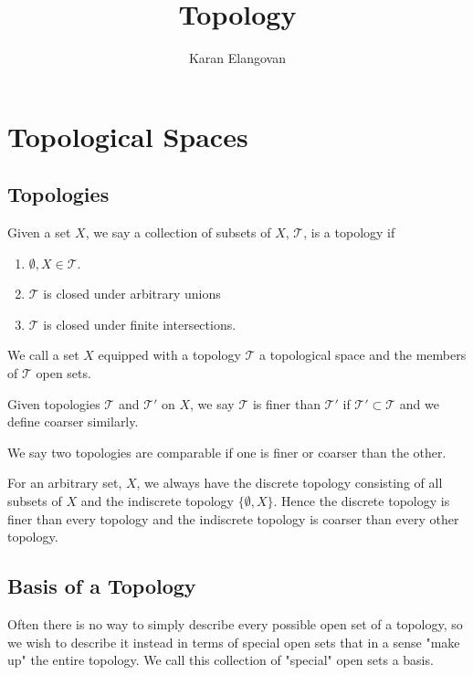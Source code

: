 \documentclass[]{article}
\title{Topology}
\author{Karan Elangovan}
\begin{document}
\maketitle

\doublespacing
\tableofcontents

\section{Topological Spaces}

\subsection{Topologies}

\begin{defi} [Topology]
		Given a set $X$, we say a collection of subsets of $X$, $\mathcal{T}$, is a topology if
		\begin{enumerate}
				\item $\emptyset, X \in \mathcal{T}$.
				\item $\mathcal{T}$ is closed under arbitrary unions
				\item $\mathcal{T}$ is closed under finite intersections.
		\end{enumerate}

		We call a set $X$ equipped with a topology $\mathcal{T}$ a topological space and the members of $\mathcal{T}$ open sets.
\end{defi}

\begin{defi} [Fineness]
		Given topologies $\mathcal{T}$ and $\mathcal{T}'$ on $X$, we say $\mathcal{T}$ is finer than $\mathcal{T}'$ if $\mathcal{T}' \subset \mathcal{T}$ and we define coarser similarly.

		We say two topologies are comparable if one is finer or coarser than the other.
\end{defi}

For an arbitrary set, $X$, we always have the discrete topology consisting of all subsets of $X$ and the indiscrete topology $\{\emptyset, X\}$. Hence the discrete topology is finer than every topology and the indiscrete topology is coarser than every other topology.

\subsection{Basis of a Topology}

Often there is no way to simply describe every possible open set of a topology, so we wish to describe it instead in terms of special open sets that in a sense "make up" the entire topology. We call this collection of "special" open sets a basis.
\end{document}
